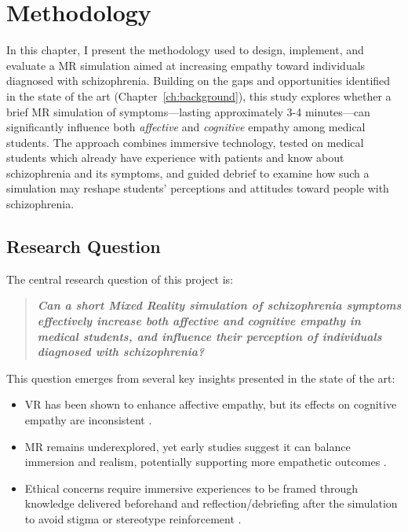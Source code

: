 \chapter{Methodology}
\label{ch:method}

In this chapter, I present the methodology used to design, implement, and evaluate a MR simulation aimed at increasing empathy toward individuals diagnosed with schizophrenia. Building on the gaps and opportunities identified in the state of the art (Chapter~\ref{ch:background}), this study explores whether a brief MR simulation of symptoms—lasting approximately 3-4 minutes—can significantly influence both \textit{affective} and \textit{cognitive} empathy among medical students. The approach combines immersive technology, tested on medical students which already have experience with patients and know about schizophrenia and its symptoms, and guided debrief to examine how such a simulation may reshape students' perceptions and attitudes toward people with schizophrenia.

\section{Research Question}

The central research question of this project is:

\begin{quote}
\textit{\textbf{Can a short Mixed Reality simulation of schizophrenia symptoms effectively increase both affective and cognitive empathy in medical students, and influence their perception of individuals diagnosed with schizophrenia?}}
\end{quote}

This question emerges from several key insights presented in the state of the art:

\begin{itemize}
    \item VR has been shown to enhance affective empathy, but its effects on cognitive empathy are inconsistent \cite{Martingano2021, Ventura2020}.
    \item MR remains underexplored, yet early studies suggest it can balance immersion and realism, potentially supporting more empathetic outcomes \cite{Silva2017, Krogmeier2024}.
    \item Ethical concerns require immersive experiences to be framed through knowledge delivered beforehand and reflection/debriefing after the simulation to avoid stigma or stereotype reinforcement \cite{Rueda2020, Ando2011}.
\end{itemize}

